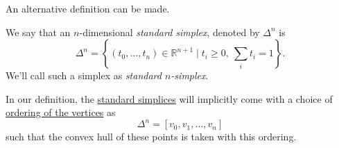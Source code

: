 An alternative definition can be made.
\begin{definition}\label{def:standard-simplex}
	We say that an \(n\)-dimensional \emph{standard simplex}, denoted by \(\Delta^n\) is
	\[
		\Delta^n = \left\{(t_0, \dots , t_{n}) \in \mathbb{R}^{n+1} \mid t_i \geq 0,\ \sum\limits_{i}t_{i}  = 1 \right\}.
	\]
	We'll call such a simplex as \emph{standard \(n\)-simplex}.
	\begin{figure}[H]
		\centering
		\label{fig:def:standard-simplex}
	\end{figure}
\end{definition}
\begin{remark}
	In our definition, the \hyperref[def:standard-simplex]{standard simplices} will implicitly come with a choice of \underline{ordering of the vertices} as
	\[
		\Delta ^n = [v_0, v_1, \dots , v_n ]
	\]
	such that the convex hull of these points is taken with this ordering.
\end{remark}